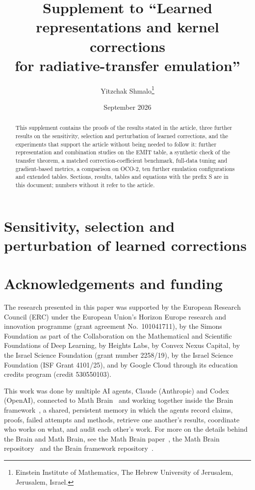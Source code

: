 \documentclass[11pt]{article}
\title{Supplement to ``Learned representations and kernel corrections\\ for radiative-transfer emulation''}
\author{Yitzchak Shmalo\thanks{Einstein Institute of Mathematics, The Hebrew University of Jerusalem, Jerusalem, Israel.}}
\date{September 2026}
\newcommand{\1}{\mathbf{1}}
\numberwithin{equation}{section}
\begin{document}
\maketitle

\begin{abstract}
This supplement contains the proofs of the results stated in the article, three further results on the
sensitivity, selection and perturbation of learned corrections, and the experiments that support the article
without being needed to follow it: further representation and combination studies on the EMIT table, a synthetic
check of the transfer theorem, a matched correction-coefficient benchmark, full-data tuning and gradient-based
metrics, a comparison on OCO-2, ten further emulation configurations and extended tables. Sections, results,
tables and equations with the prefix S are in this document; numbers without it refer to the article.
\end{abstract}

\section{Sensitivity, selection and perturbation of learned corrections}\label{supp:sensitivity}













\section*{Acknowledgements and funding}

The research presented in this paper was supported by the European Research Council (ERC) under
the European Union's Horizon Europe research and innovation programme (grant agreement
No.~101041711), by the Simons Foundation as part of the Collaboration on the Mathematical and
Scientific Foundations of Deep Learning, by Heights Labs, by Convex Nexus Capital, by the Israel
Science Foundation (grant number 2258/19), by the Israel Science Foundation (ISF Grant
4101/25), and by Google Cloud through its education credits program (credit 530550103).

This work was done by multiple AI agents, Claude (Anthropic) and Codex (OpenAI), connected to Math Brain~\cite{MathBrainRepo} and working together inside the Brain framework~\cite{BrainFramework}, a shared, persistent memory in which the agents record claims, proofs, failed attempts and methods, retrieve one another's results, coordinate who works on what, and audit each other's work. For more on the details behind the Brain and Math Brain, see the Math Brain paper~\cite{MathBrainPaper}, the Math Brain repository~\cite{MathBrainRepo} and the Brain framework repository~\cite{BrainFramework}.
\end{document}
